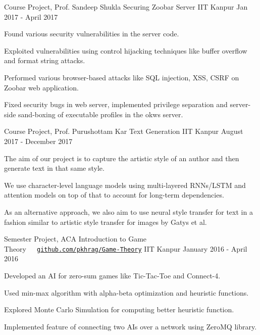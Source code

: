 \documentclass[12pt, a4paper]{awesome-cv}
\begin{document}
\begin{cventries}
  \cventry
    {Course Project, Prof. Sandeep Shukla}
    {Securing Zoobar Server}
    {IIT Kanpur}
    {Jan 2017 - April 2017}
    {
      \begin{cvitems}
      \item Found various security vulnerabilities in the server code.
      \item Exploited vulnerabilities using control hijacking techniques like buffer overflow and format string attacks.
      \item Performed various browser-based attacks like SQL injection, XSS, CSRF on Zoobar web application.
      \item Fixed security bugs in web server, implemented privilege separation and server-side sand-boxing of executable profiles in the okws server.
      \end{cvitems}
    }

  \cventry
  {Course Project, Prof. Purushottam Kar}
  {Text Generation}
  {IIT Kanpur}
  {August 2017 - December 2017}
  {
      \begin{cvitems}
              \item The aim of our project is to capture the artistic style of an author and then generate text in that same style.
              \item We use character-level language models using multi-layered RNNs/LSTM and attention models on top of that to account for long-term dependencies.
              \item As an alternative approach, we also aim to use neural style transfer for text in a fashion similar to artistic style transfer for images by Gatys et al.
      \end{cvitems}
  }

  \cventry
    {Semester Project, ACA}
    {Introduction to Game Theory\ \ \   \texttt{\href{https://github.com/pkhrag/ACA-Project-Game-Theory}{github.com/pkhrag/Game-Theory}}}
    {IIT Kanpur}	
    {January 2016 - April 2016}
    {
      \begin{cvitems}
    	\item Developed an AI for zero-sum games like Tic-Tac-Toe and Connect-4.
    	\item Used min-max algorithm with alpha-beta optimization and heuristic functions.
        \item Explored Monte Carlo Simulation for computing better heuristic function.
    	\item Implemented feature of connecting two AIs over a network using ZeroMQ library.
      \end{cvitems}
    }

\end{cventries}
\end{document}
